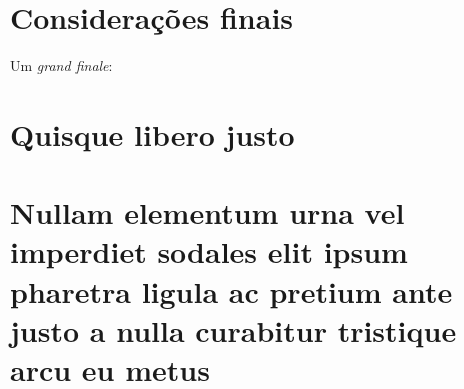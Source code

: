 \documentclass[
	12pt,				%
	openright,			%
	twoside,			%
	a4paper,			%
	english,			%
	brazil				%
	]{abntex2}
\begin{document}
\chapter*{Considerações finais} %

Um \emph{grand finale}: \lipsum[31-33]

\postextual

\printbibliography[title=Referências]

%
%

\begin{apendicesenv}

\partapendices
\chapter{Quisque libero justo}
\lipsum[50]

\chapter{Nullam elementum urna vel imperdiet sodales elit ipsum pharetra ligula
	ac pretium ante justo a nulla curabitur tristique arcu eu metus}
\lipsum[55-57]
\end{apendicesenv}
\end{document}
